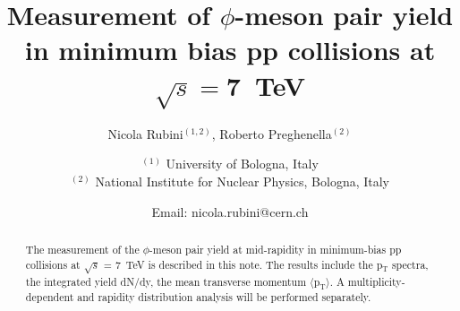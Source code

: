 \documentclass[ALICE,manyauthors]{ALICE_analysis_notes}
\begin{document}
%
%
%
\begin{titlepage}
%
\PHdate{\today}
%
\title{Measurement of $\phi$-meson pair yield in minimum bias pp collisions at $\sqrt{s}=$\SI{7}{\tera\electronvolt}}
%
\author{Nicola Rubini$^{(1,2)}$, Roberto Preghenella$^{(2)}$}
\author{
$^{(1)}$ University of Bologna, Italy\\
$^{(2)}$ National Institute for Nuclear Physics, Bologna, Italy\\
}
\author{Email: nicola.rubini@cern.ch}
%
%
\begin{abstract}
The measurement of the $\phi$-meson pair yield at mid-rapidity in minimum-bias pp collisions at $\sqrt{s}$ = \SI{7}{\tera\electronvolt} is described in this note. The results include the p$_{\text{T}}$ spectra, the integrated yield dN/dy, the mean transverse momentum $\langle \text{p}_{\text{T}} \rangle$. A multiplicity-dependent and rapidity distribution analysis will be performed separately.
\end{abstract}
\end{titlepage}
%
\tableofcontents
\newpage
%
%
\setcounter{secnumdepth}{0}

\setcounter{secnumdepth}{1}
\newpage

\newpage

\newpage

\newpage

\newpage

\newpage

\newpage

\newpage

\newpage
\appendix
%
\newpage
%
\printbibliography
%
\end{document}
